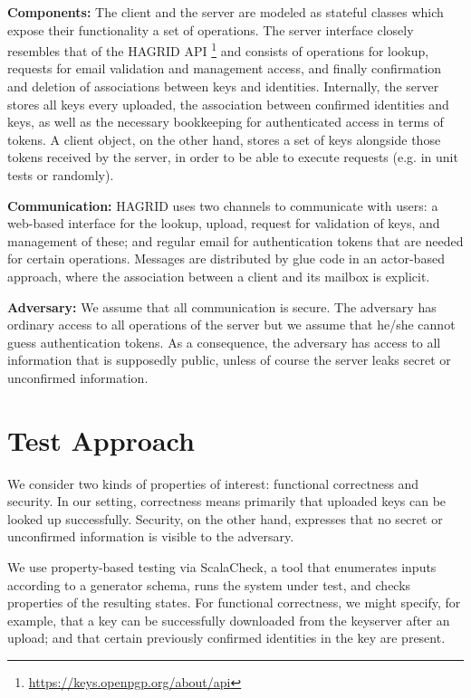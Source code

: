 \documentclass{llncs}
\begin{document}
\textbf{Components:} The client and the server are modeled as stateful classes which expose their functionality a set of operations.
The server interface closely resembles that of the HAGRID API%
    \footnote{\url{https://keys.openpgp.org/about/api}}
and consists of operations for lookup, requests for email validation and management access,
and finally confirmation and deletion of associations between keys and identities.
Internally, the server stores all keys every uploaded, the association between confirmed identities and keys,
as well as the necessary bookkeeping for authenticated access in terms of tokens.
A client object, on the other hand, stores a set of keys alongside those tokens received by the server, in order to be able to execute requests (e.g. in unit tests or randomly).

\textbf{Communication:} HAGRID uses two channels to communicate with users:
a web-based interface for the lookup, upload, request for validation of keys, and management of these;
and regular email for authentication tokens that are needed for certain operations.
Messages are distributed by glue code in an actor-based approach,
where the association between a client and its mailbox is explicit.

\textbf{Adversary:} We assume that all communication is secure.
The adversary has ordinary access to all operations of the server but we assume that he/she cannot guess authentication tokens.
As a consequence, the adversary has access to all information that is supposedly public,
unless of course the server leaks secret or unconfirmed information.

\section{Test Approach}

We consider two kinds of properties of interest: functional correctness and security.
In our setting, correctness means primarily that uploaded keys can be looked up successfully.
Security, on the other hand, expresses that no secret or unconfirmed information is visible to the adversary.

We use property-based testing via ScalaCheck, a tool that enumerates inputs according to a generator schema,
runs the system under test, and checks properties of the resulting states.
For functional correctness, we might specify, for example, that a key can be successfully downloaded from the keyserver after an upload;
and that certain previously confirmed identities in the key are present.
\end{document}

